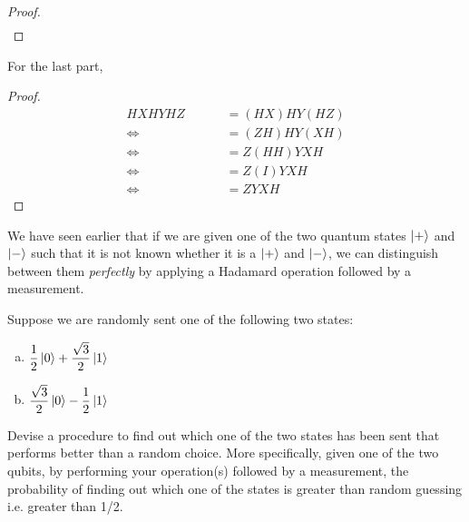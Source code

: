 \documentclass[addpoints]{exam}
\begin{document}
\begin{questions}
\begin{solution}
\begin{proof}
\begin{align*}
			\end{align*}
		\end{proof}
		For the last part,
		\begin{proof}
			\begin{align*}
				HXHYHZ                 & = (HX)HY(HZ) \\
				\iff\qquad\qquad\qquad & = (ZH)HY(XH) \\
				\iff\qquad\qquad\qquad & = Z(HH)YXH   \\
				\iff\qquad\qquad\qquad & = Z(I)YXH    \\
				\iff\qquad\qquad\qquad & = ZYXH
			\end{align*}
		\end{proof}
	\end{solution}

	\question[10] We have seen earlier that if we are given one of the two quantum states $\ket{+}$ and $\ket{-}$ such that it is not known whether it is a $\ket{+}$ and $\ket{-}$, we can distinguish between them \textit{perfectly} by applying a Hadamard operation followed by a measurement.


	Suppose we are randomly sent one of the following two states:
	\begin{enumerate}[(a)]
		\item \(\displaystyle \frac{1}{2}\ket{0} + \frac{\sqrt{3}}{2}\ket{1}\)
		\item \(\displaystyle \frac{\sqrt{3}}{2}\ket{0} - \frac{1}{2}\ket{1}\)
	\end{enumerate}

	Devise a procedure to find out which one of the two states has been sent that performs better than a random choice. More specifically, given one of the two qubits, by performing your operation(s) followed by a measurement, the probability of finding out which one of the states is greater than random guessing i.e. greater than 1/2.

	\begin{solution}

	\end{solution}


\end{questions}
\end{document}
